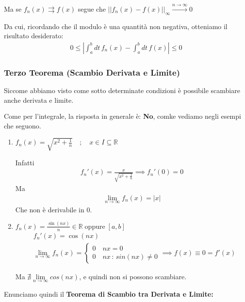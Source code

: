 Ma se $f_n(x) \rightrightarrows f(x)$ segue che $||f_n(x) -  f(x)||_\infty \overset{n\rightarrow \infty}{\longrightarrow} 0$

Da cui, ricordando che il modulo è una quantità non negativa, otteniamo il risultato desiderato:
\begin{align}
0 \leq \left|\int_{a}^{b} dt \, f_n(x) - \int_{a}^{b} dt \, f(x)\right| \leq 0
\end{align}

\subsubsection{Terzo Teorema (Scambio Derivata e Limite)}

Siccome abbiamo visto come sotto determinate condizioni è possibile scambiare anche derivata e limite. 

Come per l'integrale, la risposta in generale è: \textbf{No}, comke vediamo negli esempi che seguono.

\begin{enumerate}
	\item $f_n(x)= \sqrt{x^2 + \frac{1}{n}} \quad; \quad x\in I\subseteq \mathbb{R}$
		
		Infatti
		\begin{align}
		f_n'(x)= \frac{x}{\sqrt{x^2 + \frac{1}{n}}} \implies f_n'(0) = 0 
		\end{align}
		Ma
		\begin{align}
		\underset{n\rightarrow \infty}{\lim} f_n(x)= |x|
		\end{align}
		Che non è derivabile in 0.
	
	\item $f_n(x) = \frac{\sin(nx)}{n}\in \mathbb{R} \; \text{oppure} \; [a,b]$ 
		\begin{align}
		{}&f_n'(x)=\cos(nx)\\
		&\underset{n\rightarrow \infty}{\lim} f_n(x)= \left\{
		\begin{array}{cc}
			0 \quad nx=0  \quad \quad \quad \quad \;\; \\
			0 \quad nx \, : \, sin(nx) \neq 0
		\end{array}
		\right. \implies f(x) \equiv 0 = f'(x)
		\end{align}
	
	Ma $\nexists \underset{n\rightarrow \infty}{\lim} cos(nx)$, e quindi non si possono scambiare.
\end{enumerate}	 
\newpage

Enunciamo quindi il \textbf{Teorema di Scambio tra Derivata e Limite:}

